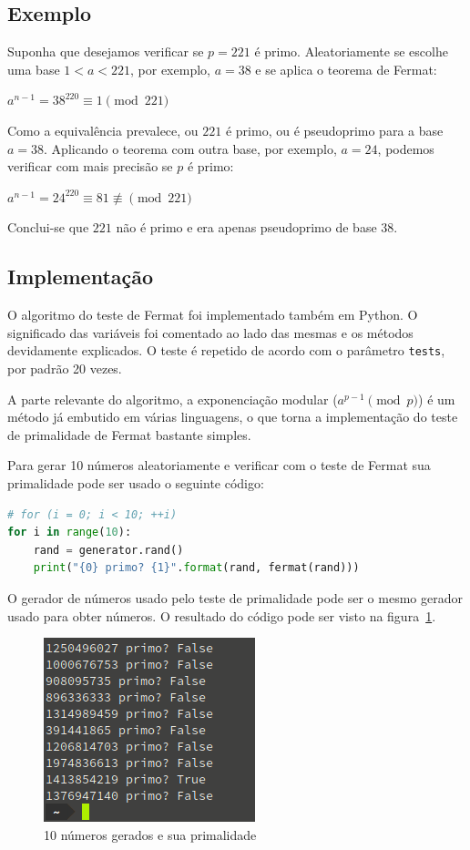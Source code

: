 \documentclass[12pt]{article}
\begin{document}
\subsection{Exemplo}

Suponha que desejamos verificar se $p = 221$ é primo. Aleatoriamente se escolhe
uma base $1 < a < 221$, por exemplo, $a = 38$ e se aplica o teorema de Fermat:
\begin{center}
    $a^{n - 1} = 38^{220} \equiv 1 \pmod{221}$
\end{center}
Como a equivalência prevalece, ou $221$ é primo, ou é pseudoprimo para a base
$a = 38$. Aplicando o teorema com outra base, por exemplo, $a = 24$, podemos
verificar com mais precisão se $p$ é primo:
\begin{center}
    $a^{n - 1} = 24^{220} \equiv 81 \not\equiv \pmod{221}$
\end{center}
Conclui-se que $221$ não é primo e era apenas pseudoprimo de base $38$.

\subsection{Implementação}

O algoritmo do teste de Fermat foi implementado também em Python. O significado
das variáveis foi comentado ao lado das mesmas e os métodos devidamente
explicados. O teste é repetido de acordo com o parâmetro \texttt{tests}, por
padrão 20 vezes.



A parte relevante do algoritmo, a exponenciação modular ($a^{p - 1} \pmod{p}$)
é um método já embutido em várias linguagens, o que torna a implementação do
teste de primalidade de Fermat bastante simples.

Para gerar 10 números aleatoriamente e verificar com o teste de Fermat sua
primalidade pode ser usado o seguinte código:

\begin{lstlisting}[language=Python]
# for (i = 0; i < 10; ++i)
for i in range(10):
    rand = generator.rand()
    print("{0} primo? {1}".format(rand, fermat(rand)))
\end{lstlisting}

O gerador de números usado pelo teste de primalidade pode ser o mesmo gerador
usado para obter números. O resultado do código pode ser visto na
figura~\ref{fig:fpt_output}.

\begin{figure}[ht]
    \centering
    \includegraphics{fpt_output.png}
    \caption{10 números gerados e sua primalidade}
    \label{fig:fpt_output}
\end{figure}
\end{document}

